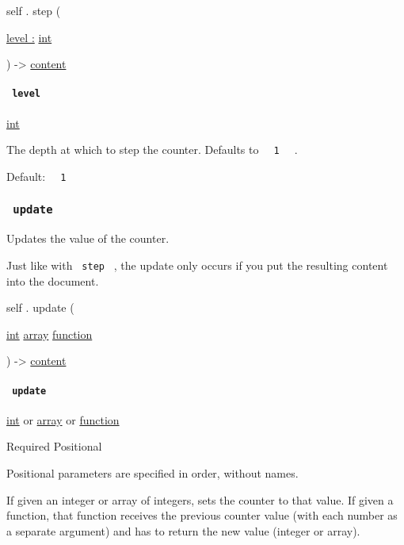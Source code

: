 self { . } { step } (

{ \hyperref[definitions-step-parameters-level]{level :}
\href{/docs/reference/foundations/int/}{int} }

) -\textgreater{} \href{/docs/reference/foundations/content/}{content}

\paragraph{\texorpdfstring{\texttt{\ level\ }}{ level }}\label{definitions-step-level}

\href{/docs/reference/foundations/int/}{int}

The depth at which to step the counter. Defaults to
\texttt{\ }{\texttt{\ 1\ }}\texttt{\ } .

Default: \texttt{\ }{\texttt{\ 1\ }}\texttt{\ }

\subsubsection{\texorpdfstring{\texttt{\ update\ }}{ update }}\label{definitions-update}

Updates the value of the counter.

Just like with \texttt{\ step\ } , the update only occurs if you put the
resulting content into the document.

self { . } { update } (

{ \href{/docs/reference/foundations/int/}{int}
\href{/docs/reference/foundations/array/}{array}
\href{/docs/reference/foundations/function/}{function} }

) -\textgreater{} \href{/docs/reference/foundations/content/}{content}

\paragraph{\texorpdfstring{\texttt{\ update\ }}{ update }}\label{definitions-update-update}

\href{/docs/reference/foundations/int/}{int} {or}
\href{/docs/reference/foundations/array/}{array} {or}
\href{/docs/reference/foundations/function/}{function}

{Required} {{ Positional }}

\label{definitions-update-update-positional-tooltip}
Positional parameters are specified in order, without names.

If given an integer or array of integers, sets the counter to that
value. If given a function, that function receives the previous counter
value (with each number as a separate argument) and has to return the
new value (integer or array).

